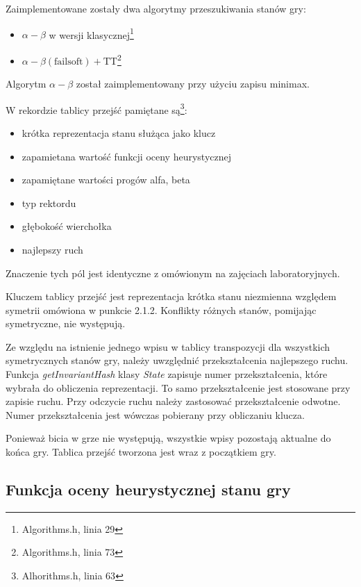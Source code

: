 \documentclass{scrartcl}
\begin{document}
Zaimplementowane zostały dwa algorytmy przeszukiwania stanów gry:
\begin{itemize}
\item $\alpha - \beta$ w wersji klasycznej\footnote{Algorithms.h, 
    linia 29}
\item $\alpha - \beta (\text{failsoft}) + \text{TT}$\footnote{Algorithms.h, linia 73}
\end{itemize}

Algorytm $\alpha - \beta$ został zaimplementowany przy użyciu 
zapisu minimax.

W rekordzie tablicy przejść pamiętane są\footnote{Alhorithms.h, 
linia 63}:
\begin{itemize}
\item{krótka reprezentacja stanu służąca jako klucz}
\item{zapamietana wartość funkcji oceny heurystycznej}
\item{zapamiętane wartości progów alfa, beta}
\item{typ rektordu}
\item{głębokość wierchołka}
\item{najlepszy ruch}
\end{itemize}

Znaczenie tych pól jest identyczne z omówionym na zajęciach 
laboratoryjnych. 

Kluczem tablicy przejść jest reprezentacja krótka stanu niezmienna
względem symetrii omówiona w punkcie 2.1.2. Konflikty różnych 
stanów, pomijając symetryczne, nie występują.

Ze względu na istnienie jednego wpisu w tablicy transpozycji dla
wszystkich symetrycznych stanów gry, należy uwzględnić przekształcenia
najlepszego ruchu. Funkcja \emph{getInvariantHash} klasy \emph{State}
zapisuje numer przekształcenia, które wybrała do obliczenia 
reprezentacji. To samo przekształcenie jest stosowane przy zapisie
ruchu. Przy odczycie ruchu należy zastosować przekształcenie
odwotne. Numer przekształcenia jest wówczas pobierany przy obliczaniu 
klucza.

Ponieważ bicia w grze nie występują, wszystkie wpisy pozostają 
aktualne do końca gry. 
Tablica przejść tworzona jest wraz z początkiem gry.


\subsection{Funkcja oceny heurystycznej stanu gry}
\end{document}
